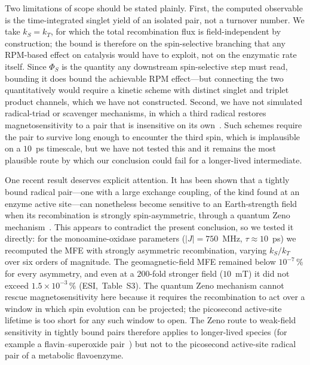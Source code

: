 \documentclass[twoside,twocolumn,9pt]{article}
\begin{document}
Two limitations of scope should be stated plainly. First, the computed observable
is the time-integrated singlet yield of an isolated pair, not a turnover number.
We take $k_S = k_T$, for which the total recombination flux is field-independent
by construction; the bound is therefore on the spin-selective branching that any
RPM-based effect on catalysis would have to exploit, not on the enzymatic rate
itself. Since $\Phi_S$ is the quantity any downstream spin-selective step must
read, bounding it does bound the achievable RPM effect---but connecting the two
quantitatively would require a kinetic scheme with distinct singlet and triplet
product channels, which we have not constructed. Second, we have not simulated
radical-triad or scavenger mechanisms, in which a third radical restores
magnetosensitivity to a pair that is insensitive on its own~\cite{Kattnig2017}.
Such schemes require the pair to survive long enough to encounter the third
spin, which is implausible on a $10$~ps timescale, but we have not tested this
and it remains the most plausible route by which our conclusion could fail for a
longer-lived intermediate.

One recent result deserves explicit attention. It has been shown that a tightly
bound radical pair---one with a large exchange coupling, of the kind found at an
enzyme active site---can nonetheless become sensitive to an Earth-strength field
when its recombination is strongly spin-asymmetric, through a quantum Zeno
mechanism~\cite{Denton2024}. This appears to contradict the present conclusion,
so we tested it directly: for the monoamine-oxidase parameters
($|J| = 750$~MHz, $\tau\approx10$~ps) we recomputed the MFE with strongly
asymmetric recombination, varying $k_S/k_T$ over six orders of magnitude. The
geomagnetic-field MFE remained below $10^{-7}\,\%$ for every asymmetry, and even at a
$200$-fold stronger field ($10$~mT) it did not exceed $1.5\times10^{-3}\,\%$
(ESI,\dag~Table~S3). The
quantum Zeno mechanism cannot rescue magnetosensitivity here because it requires
the recombination to act over a window in which spin evolution can be projected;
the picosecond active-site lifetime is too short for any such window to open. The
Zeno route to weak-field sensitivity in tightly bound pairs therefore applies to
longer-lived species (for example a flavin--superoxide pair~\cite{Denton2024,Player2019})
but not to the picosecond active-site radical pair of a metabolic flavoenzyme.
\end{document}
